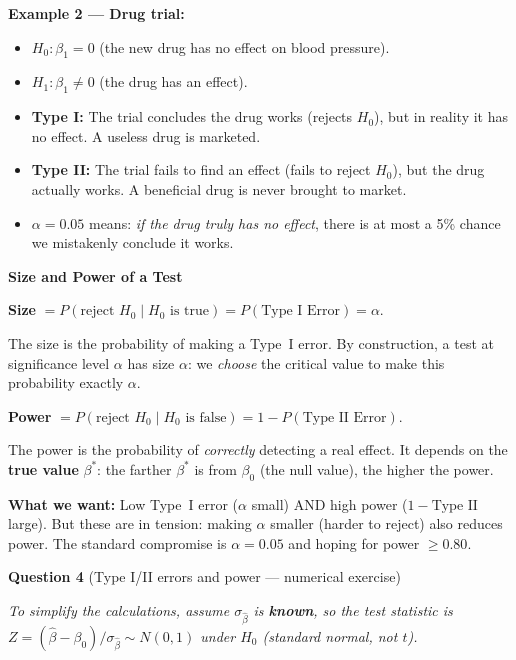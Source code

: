 \documentclass[11pt,a4paper]{article}
\begin{document}
\begin{bookexample}
\medskip
\textbf{Example 2 --- Drug trial:}
\begin{itemize}[leftmargin=1.5em, itemsep=2pt]
  \item $H_0\colon \beta_1 = 0$ (the new drug has no effect on blood pressure).
  \item $H_1\colon \beta_1 \ne 0$ (the drug has an effect).
  \item \textbf{Type I:} The trial concludes the drug works (rejects $H_0$), but in reality it has no effect. A useless drug is marketed.
  \item \textbf{Type II:} The trial fails to find an effect (fails to reject $H_0$), but the drug actually works. A beneficial drug is never brought to market.
  \item $\alpha = 0.05$ means: \emph{if the drug truly has no effect}, there is at most a 5\% chance we mistakenly conclude it works.
\end{itemize}
\end{bookexample}

\begin{bookexample}
\textbf{\color{blockcolor}Size and Power of a Test}

\smallskip
\textbf{Size} $= P(\text{reject } H_0 \mid H_0 \text{ is true}) = P(\text{Type I Error}) = \alpha$.

The size is the probability of making a Type~I error. By construction, a test at significance level $\alpha$ has size $\alpha$: we \emph{choose} the critical value to make this probability exactly $\alpha$.

\medskip
\textbf{Power} $= P(\text{reject } H_0 \mid H_0 \text{ is false}) = 1 - P(\text{Type II Error})$.

The power is the probability of \emph{correctly} detecting a real effect. It depends on the \textbf{true value} $\beta^*$: the farther $\beta^*$ is from $\beta_0$ (the null value), the higher the power.

\medskip
\textbf{What we want:} Low Type~I error ($\alpha$ small) AND high power ($1 - \text{Type II}$ large). But these are in tension: making $\alpha$ smaller (harder to reject) also reduces power. The standard compromise is $\alpha = 0.05$ and hoping for power $\ge 0.80$.
\end{bookexample}

\bigskip

\textbf{Question 4} (Type I/II errors and power --- numerical exercise)

\medskip
\textit{To simplify the calculations, assume $\sigma_{\hat{\beta}}$ is \textbf{known}, so the test statistic is $Z = (\hat{\beta} - \beta_0)/\sigma_{\hat{\beta}} \sim N(0,1)$ under $H_0$ (standard normal, not $t$).}
\end{document}
